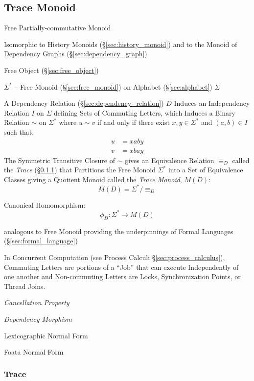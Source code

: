\subsection{Trace Monoid}\label{sec:trace_monoid}

Free Partially-commutative Monoid

Isomorphic to History Monoids (\S\ref{sec:history_monoid}) and to the
Monoid of Dependency Graphs (\S\ref{sec:dependency_graph})

Free Object (\S\ref{sec:free_object})

$\Sigma^*$ -- Free Monoid (\S\ref{sec:free_monoid}) on Alphabet
(\S\ref{sec:alphabet}) $\Sigma$

A Dependency Relation (\S\ref{sec:dependency_relation}) $D$ Induces an
Independency Relation $I$ on $\Sigma$ defining Sets of Commuting
Letters, which Induces a Binary Relation $\sim$ on $\Sigma^*$ where $u
\sim v$ if and only if there exist $x,y \in \Sigma^*$ and $(a,b) \in
I$ such that:
\begin{align*}
  u &= xaby \\
  v &= xbay
\end{align*}
The Symmetric Transitive Closure of $\sim$ gives an Equivalence
Relation $\equiv_D$ called the \emph{Trace} (\S\ref{sec:trace}) that
Partitions the Free Monoid $\Sigma^*$ into a Set of Equivalence
Classes giving a Quotient Monoid called the \emph{Trace Monoid},
$M(D)$:
\[
  M(D) = \Sigma^*/\equiv_D
\]

Canonical Homomorphism:
\[
  \phi_D : \Sigma^* \rightarrow M(D)
\]

analogous to Free Monoid providing the underpinnings of Formal
Languages (\S\ref{sec:formal_language})

In Concurrent Computation (see Process Calculi
\S\ref{sec:process_calculus}), Commuting Letters are portions of a
``Job'' that can execute Independently of one another and
Non-commuting Letters are Locks, Synchronization Points, or Thread
Joins. %

\emph{Cancellation Property}

\emph{Dependency Morphism}

Lexicographic Normal Form

Foata Normal Form



\subsubsection{Trace}\label{sec:trace}

